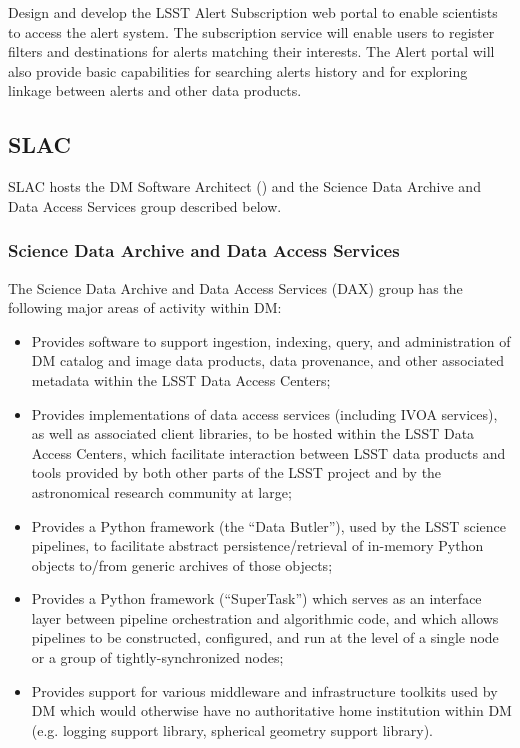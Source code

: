 Design and develop the LSST Alert Subscription web portal to enable scientists to access the alert system. The subscription service will enable users to register filters and destinations for alerts matching their interests. The Alert portal will also provide basic capabilities for searching alerts history and for exploring linkage between alerts and other data products.




\subsection {SLAC\label{sect:slac}}
SLAC hosts the DM Software Architect () and the Science Data Archive and Data Access
Services group described below.

\subsubsection{Science Data Archive and Data Access Services \label{sect:dax}}

The Science Data Archive and Data Access Services (DAX) group has the following major areas of activity
within DM:

\begin{itemize}

  \item{Provides software to support ingestion, indexing, query, and administration of DM catalog and image
  data products, data provenance, and other associated metadata within the LSST Data Access Centers;}

  \item{Provides implementations of data access services (including IVOA services), as well as associated
  client libraries, to be hosted within the LSST Data Access Centers, which facilitate interaction between
  LSST data products and tools provided by both other parts of the LSST project and by the astronomical
  research community at large;}

  \item{Provides a Python framework (the ``Data Butler''), used by the LSST science pipelines, to facilitate
  abstract persistence/retrieval of in-memory Python objects to/from generic archives of those objects;}

  \item{Provides a Python framework (``SuperTask'') which serves as an interface layer between pipeline
  orchestration and algorithmic code, and which allows pipelines to be constructed, configured, and run at
  the level of a single node or a group of tightly-synchronized nodes;}

  \item{Provides support for various middleware and infrastructure toolkits used by DM which would otherwise
  have no authoritative home institution within DM (e.g. logging support library, spherical geometry support
  library).}

\end{itemize}

